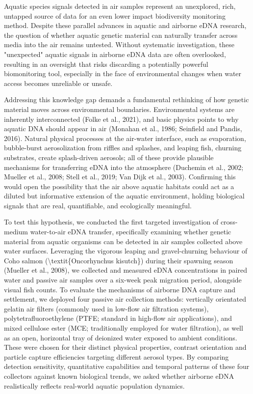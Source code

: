 \documentclass{article}
\begin{document}
Aquatic species signals detected in air samples represent an unexplored, rich, untapped source of data for an even lower impact biodiversity monitoring method. Despite these parallel advances in aquatic and airborne eDNA research, the question of whether aquatic genetic material can naturally transfer across media into the air remains untested. Without systematic investigation, these "unexpected" aquatic signals in airborne eDNA data are often overlooked, resulting in an oversight that risks discarding a potentially powerful biomonitoring tool, especially in the face of environmental changes when water access becomes unreliable or unsafe.

Addressing this knowledge gap demands a fundamental rethinking of how genetic material moves across environmental boundaries. Environmental systems are inherently interconnected (Folke et al., 2021), and basic physics points to why aquatic DNA should appear in air (Monahan et al., 1986; Seinfield and Pandis, 2016). Natural physical processes at the air-water interface, such as evaporation, bubble-burst aerosolization from riffles and splashes, and leaping fish, churning substrates, create splash-driven aerosols; all of these provide plausible mechanisms for transferring eDNA into the atmosphere (Duchemin et al., 2002; Mueller et al., 2008; Stell et al., 2019; Van Dijk et al., 2003). Confirming this would open the possibility that the air above aquatic habitats could act as a diluted but informative extension of the aquatic environment, holding biological signals that are real, quantifiable, and ecologically meaningful.

To test this hypothesis, we conducted the first targeted investigation of cross-medium water-to-air eDNA transfer, specifically examining whether genetic material from aquatic organisms can be detected in air samples collected above water surfaces. Leveraging the vigorous leaping and gravel-churning behaviour of Coho salmon (\textbackslash{}textit\{Oncorhynchus kisutch\}) during their spawning season (Mueller et al., 2008), we collected and measured eDNA concentrations in paired water and passive air samples over a six-week peak migration period, alongside visual fish counts. To evaluate the mechanisms of airborne DNA capture and settlement, we deployed four passive air collection methods: vertically orientated gelatin air filters (commonly used in low-flow air filtration systems), polytetrafluoroethylene (PTFE; standard in high-flow air applications), and mixed cellulose ester (MCE; traditionally employed for water filtration), as well as an open, horizontal tray of deionized water exposed to ambient conditions. These were chosen for their distinct physical properties, contrast orientation and particle capture efficiencies targeting different aerosol types. By comparing detection sensitivity, quantitative capabilities and temporal patterns of these four collectors against known biological trends, we asked whether airborne eDNA realistically reflects real-world aquatic population dynamics.
\end{document}
